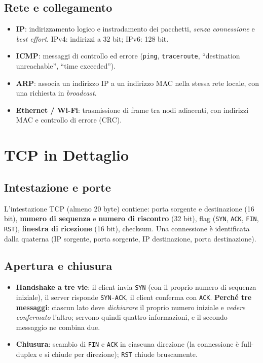 \subsection{Rete e collegamento}
\begin{itemize}
    \item \textbf{IP}: indirizzamento logico e instradamento dei pacchetti, \emph{senza connessione} e \emph{best effort}. IPv4: indirizzi a 32 bit; IPv6: 128 bit.
    \item \textbf{ICMP}: messaggi di controllo ed errore (\texttt{ping}, \texttt{traceroute}, ``destination unreachable'', ``time exceeded'').
    \item \textbf{ARP}: associa un indirizzo IP a un indirizzo MAC nella stessa rete locale, con una richiesta in \emph{broadcast}.
    \item \textbf{Ethernet / Wi-Fi}: trasmissione di frame tra nodi adiacenti, con indirizzi MAC e controllo di errore (CRC).
\end{itemize}

\section{TCP in Dettaglio}

\subsection{Intestazione e porte}
L'intestazione TCP (almeno 20 byte) contiene: porta sorgente e destinazione (16 bit), \textbf{numero di sequenza} e \textbf{numero di riscontro} (32 bit), flag (\texttt{SYN}, \texttt{ACK}, \texttt{FIN}, \texttt{RST}), \textbf{finestra di ricezione} (16 bit), checksum. Una connessione è identificata dalla quaterna (IP sorgente, porta sorgente, IP destinazione, porta destinazione).

\subsection{Apertura e chiusura}
\begin{itemize}
    \item \textbf{Handshake a tre vie}: il client invia \texttt{SYN} (con il proprio numero di sequenza iniziale), il server risponde \texttt{SYN-ACK}, il client conferma con \texttt{ACK}. \textbf{Perché tre messaggi}: ciascun lato deve \emph{dichiarare} il proprio numero iniziale e \emph{vedere confermato} l'altro; servono quindi quattro informazioni, e il secondo messaggio ne combina due.
    \item \textbf{Chiusura}: scambio di \texttt{FIN} e \texttt{ACK} in ciascuna direzione (la connessione è full-duplex e si chiude per direzione); \texttt{RST} chiude bruscamente.
\end{itemize}

